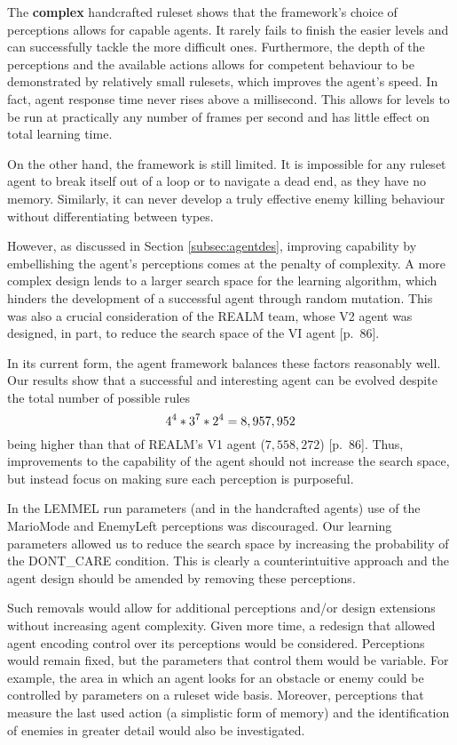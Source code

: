 The \textbf{complex} handcrafted ruleset shows that the framework's choice of perceptions allows for capable agents. It rarely fails to finish the easier levels and can successfully tackle the more difficult ones. Furthermore, the depth of the perceptions and the available actions allows for competent behaviour to be demonstrated by relatively small rulesets, which improves the agent's speed. In fact, agent response time never rises above a millisecond. This allows for levels to be run at practically any number of frames per second and has little effect on total learning time.

On the other hand, the framework is still limited. It is impossible for any ruleset agent to break itself out of a loop or to navigate a dead end, as they have no memory. Similarly, it can never develop a truly effective enemy killing behaviour without differentiating between types.

However, as discussed in Section \ref{subsec:agentdes}, improving capability by embellishing the agent's perceptions comes at the penalty of complexity. A more complex design lends to a larger search space for the learning algorithm, which hinders the development of a successful agent through random mutation. This was also a crucial consideration of the REALM team, whose V2 agent was designed, in part, to reduce the search space of the VI agent \cite{realm}[p.~86].

In its current form, the agent framework balances these factors reasonably well. Our results show that a successful and interesting agent can be evolved despite the total number of possible rules
\[ \centering
4^4 * 3^7 * 2^4 = 8,957,952
\]
being higher than that of REALM's V1 agent ($7,558,272$) \cite{realm}[p.~86]. Thus, improvements to the capability of the agent should not increase the search space, but instead focus on making sure each perception is purposeful.

In the LEMMEL run parameters (and in the handcrafted agents) use of the MarioMode and EnemyLeft perceptions was discouraged. Our learning parameters allowed us to reduce the search space by increasing the probability of the {\footnotesize DONT\_CARE} condition. This is clearly a counterintuitive approach and the agent design should be amended by removing these perceptions. 

Such removals would allow for additional perceptions and/or design extensions without increasing agent complexity. Given more time, a redesign that allowed agent encoding control over its perceptions would be considered. Perceptions would remain fixed, but the parameters that control them would be variable. For example, the area in which an agent looks for an obstacle or enemy could be controlled by parameters on a ruleset wide basis. Moreover, perceptions that measure the last used action (a simplistic form of memory) and the identification of enemies in greater detail would also be investigated.


